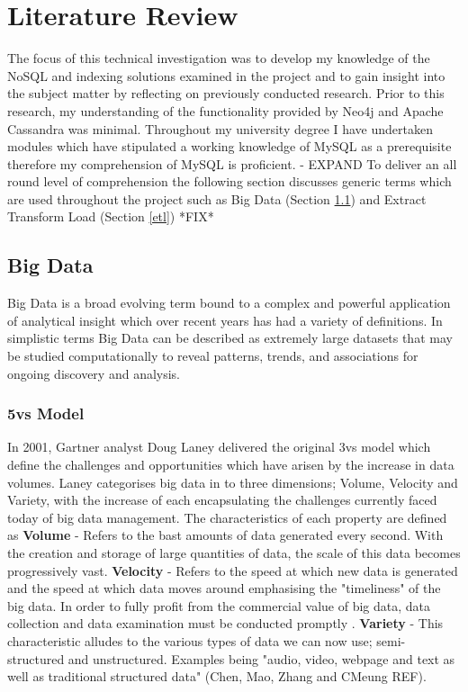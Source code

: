 \chapter{Literature Review}
The focus of this technical investigation was to develop my knowledge of the NoSQL and indexing solutions examined in the project and to gain insight into the subject matter by reflecting on previously conducted research. Prior to this research, my understanding of the functionality provided by Neo4j and Apache Cassandra was minimal. Throughout my university degree I have undertaken modules which have stipulated a working knowledge of MySQL as a prerequisite therefore my comprehension of MySQL is proficient. - EXPAND
To deliver an all round level of comprehension the following section discusses generic terms which are used throughout the project such as Big Data (Section \ref{bigdata}) and Extract Transform Load (Section \ref{etl}) *FIX*

\section{Big Data}\label{bigdata}
Big Data is a broad evolving term bound to a complex and powerful application of analytical insight which over recent years has had a variety of definitions. In simplistic terms Big Data can be described as extremely large datasets that may be studied computationally to reveal patterns, trends, and associations for ongoing discovery and analysis.

\subsection{5vs Model}
In 2001, Gartner analyst Doug Laney delivered the original 3vs model which define the challenges and opportunities which have arisen by the increase in data volumes. Laney categorises big data in to three dimensions; Volume, Velocity and Variety, with the increase of each encapsulating the challenges currently faced today of big data management. The characteristics of each property are defined as \textbf{Volume} - Refers to the bast amounts of data generated every second. With the creation and storage of large quantities of data, the scale of this data becomes progressively vast. \textbf{Velocity} - Refers to the speed at which new data is generated and the speed at which data moves around emphasising the "timeliness" of the big data. In order to fully profit from the commercial value of big data, data collection and data examination must be conducted promptly . \textbf{Variety} - This characteristic alludes to the various types of data we can now use; semi-structured and unstructured. Examples being "audio, video, webpage and text as well as traditional structured data" (Chen, Mao, Zhang and CMeung REF).

